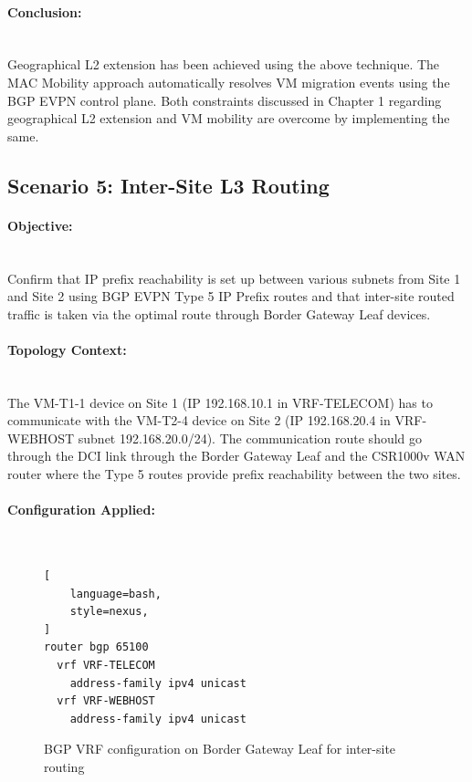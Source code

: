 \paragraph{Conclusion:}~\\
Geographical L2 extension has been achieved using the above technique. The MAC Mobility approach automatically resolves VM migration events using the BGP EVPN control plane. Both constraints discussed in Chapter 1 regarding geographical L2 extension and VM mobility are overcome by implementing the same.

\subsection{Scenario 5: Inter-Site L3 Routing}
\paragraph{Objective:}~\\
Confirm that IP prefix reachability is set up between various subnets from Site 1 and Site 2 using BGP EVPN Type 5 IP Prefix routes and that inter-site routed traffic is taken via the optimal route through Border Gateway Leaf devices.

\paragraph{Topology Context:}~\\
The VM-T1-1 device on Site 1 (IP 192.168.10.1 in VRF-TELECOM) has to communicate with the VM-T2-4 device on Site 2 (IP 192.168.20.4 in VRF-WEBHOST subnet 192.168.20.0/24). The communication route should go through the DCI link through the Border Gateway Leaf and the CSR1000v WAN router where the Type 5 routes provide prefix reachability between the two sites.

\paragraph{Configuration Applied:}~\\
\begin{figure}[!htbp]
\centering
\begin{lstlisting}[
    language=bash,
    style=nexus,
]
router bgp 65100
  vrf VRF-TELECOM
    address-family ipv4 unicast
  vrf VRF-WEBHOST
    address-family ipv4 unicast
\end{lstlisting}
\caption{BGP VRF configuration on Border Gateway Leaf for inter-site routing}
\label{fig:scenario5-bgp-vrf}
\end{figure}

